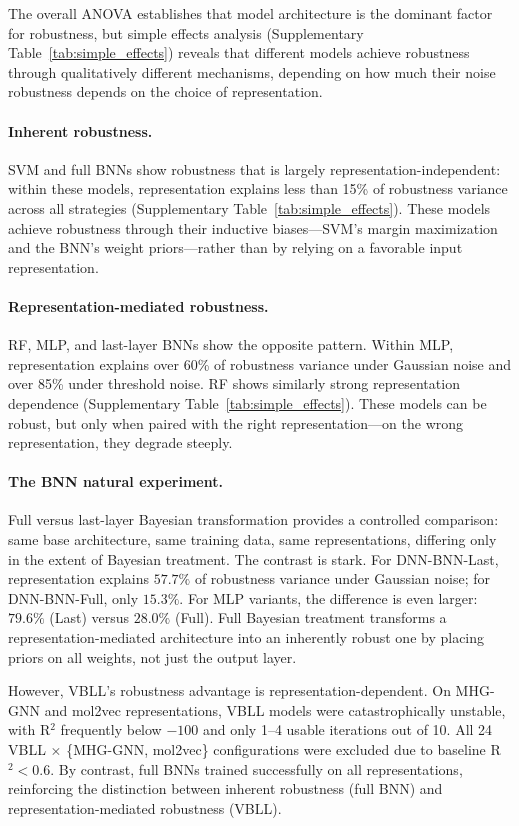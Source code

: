 \documentclass[pdflatex,sn-mathphys-num]{sn-jnl}%
\theoremstyle{thmstyleone}%
\theoremstyle{thmstyletwo}%
\theoremstyle{thmstylethree}%
\begin{document}
The overall ANOVA establishes that model architecture is the dominant factor for robustness, but simple effects analysis (Supplementary Table~\ref{tab:simple_effects}) reveals that different models achieve robustness through qualitatively different mechanisms, depending on how much their noise robustness depends on the choice of representation.

\paragraph{Inherent robustness.} SVM and full BNNs show robustness that is largely representation-independent: within these models, representation explains less than 15\% of robustness variance across all strategies (Supplementary Table~\ref{tab:simple_effects}). These models achieve robustness through their inductive biases---SVM's margin maximization and the BNN's weight priors---rather than by relying on a favorable input representation.

\paragraph{Representation-mediated robustness.} RF, MLP, and last-layer BNNs show the opposite pattern. Within MLP, representation explains over 60\% of robustness variance under Gaussian noise and over 85\% under threshold noise. RF shows similarly strong representation dependence (Supplementary Table~\ref{tab:simple_effects}). These models can be robust, but only when paired with the right representation---on the wrong representation, they degrade steeply.

\paragraph{The BNN natural experiment.} Full versus last-layer Bayesian transformation provides a controlled comparison: same base architecture, same training data, same representations, differing only in the extent of Bayesian treatment. The contrast is stark. For DNN-BNN-Last, representation explains $57.7\%$ of robustness variance under Gaussian noise; for DNN-BNN-Full, only $15.3\%$. For MLP variants, the difference is even larger: $79.6\%$ (Last) versus $28.0\%$ (Full). Full Bayesian treatment transforms a representation-mediated architecture into an inherently robust one by placing priors on all weights, not just the output layer.

However, VBLL's robustness advantage is representation-dependent. On MHG-GNN and mol2vec representations, VBLL models were catastrophically unstable, with R$^2$ frequently below $-100$ and only 1--4 usable iterations out of 10. All 24 VBLL $\times$ \{MHG-GNN, mol2vec\} configurations were excluded due to baseline R$^2 < 0.6$. By contrast, full BNNs trained successfully on all representations, reinforcing the distinction between inherent robustness (full BNN) and representation-mediated robustness (VBLL).
\end{document}
